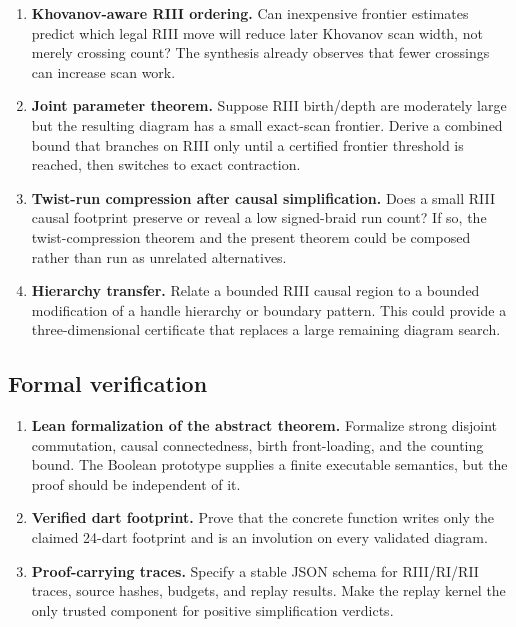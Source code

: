 \begin{enumerate}[label=\textbf{Q\arabic*.},resume]
\item \textbf{Khovanov-aware RIII ordering.}
      Can inexpensive frontier estimates predict which legal RIII move will
      reduce later Khovanov scan width, not merely crossing count?  The synthesis
      already observes that fewer crossings can increase scan work.

\item \textbf{Joint parameter theorem.}
      Suppose RIII birth/depth are moderately large but the resulting diagram
      has a small exact-scan frontier.  Derive a combined bound that branches on
      RIII only until a certified frontier threshold is reached, then switches
      to exact contraction.

\item \textbf{Twist-run compression after causal simplification.}
      Does a small RIII causal footprint preserve or reveal a low signed-braid
      run count?  If so, the twist-compression theorem and the present theorem
      could be composed rather than run as unrelated alternatives.

\item \textbf{Hierarchy transfer.}
      Relate a bounded RIII causal region to a bounded modification of a handle
      hierarchy or boundary pattern.  This could provide a three-dimensional
      certificate that replaces a large remaining diagram search.
\end{enumerate}

\subsection{Formal verification}

\begin{enumerate}[label=\textbf{Q\arabic*.},resume]
\item \textbf{Lean formalization of the abstract theorem.}
      Formalize strong disjoint commutation, causal connectedness, birth
      front-loading, and the counting bound.  The Boolean prototype supplies a
      finite executable semantics, but the proof should be independent of it.

\item \textbf{Verified dart footprint.}
      Prove that the concrete  function writes only the claimed
      24-dart footprint and is an involution on every validated diagram.

\item \textbf{Proof-carrying traces.}
      Specify a stable JSON schema for RIII/RI/RII traces, source hashes, budgets,
      and replay results.  Make the replay kernel the only trusted component for
      positive simplification verdicts.
\end{enumerate}


